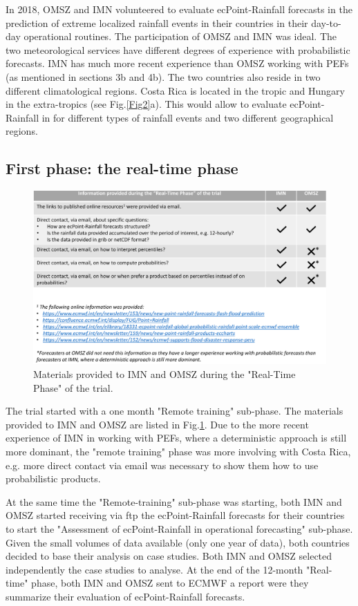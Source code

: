 \documentclass[twocol]{ametsocV5} %
\begin{document}
In 2018, OMSZ and IMN volunteered to evaluate ecPoint-Rainfall forecasts in the prediction of extreme localized rainfall events in their countries in their day-to-day operational routines. The participation of OMSZ and IMN was ideal. The two meteorological services have different degrees of experience with probabilistic forecasts. IMN has much more recent experience than OMSZ working with PEFs (as mentioned in sections 3b and 4b). The two countries also reside in two different climatological regions. Costa Rica is located in the tropic and Hungary in the extra-tropics (see Fig.\ref{Fig2}a). This would allow to evaluate ecPoint-Rainfall in for different types of rainfall events and two different geographical regions.

\subsection{First phase: the real-time phase}
 \begin{figure}
\centerline{\includegraphics[width=39pc]{manuscript/Figures/Fig5.png}}
\caption{Materials provided to IMN and OMSZ during the "Real-Time Phase" of the trial. }
\label{Fig5}
\end{figure}
 
The trial started with a one month "Remote training" sub-phase. The materials provided to IMN and OMSZ are listed in Fig.\ref{Fig5}. Due to the more recent experience of IMN in working with PEFs, where a deterministic approach is still more dominant, the "remote training" phase was more involving with Costa Rica, e.g. more direct contact via email was necessary to show them how to use probabilistic products.\par  

At the same time the "Remote-training" sub-phase was starting, both IMN and OMSZ started receiving via ftp the ecPoint-Rainfall forecasts for their countries to start the "Assessment of ecPoint-Rainfall in operational forecasting" sub-phase. Given the small volumes of data available (only one year of data), both countries decided to base their analysis on case studies. Both IMN and OMSZ selected independently the case studies to analyse. At the end of the 12-month "Real-time" phase, both IMN and OMSZ sent to ECMWF a report were they summarize their evaluation of ecPoint-Rainfall forecasts.
	
\end{document}

